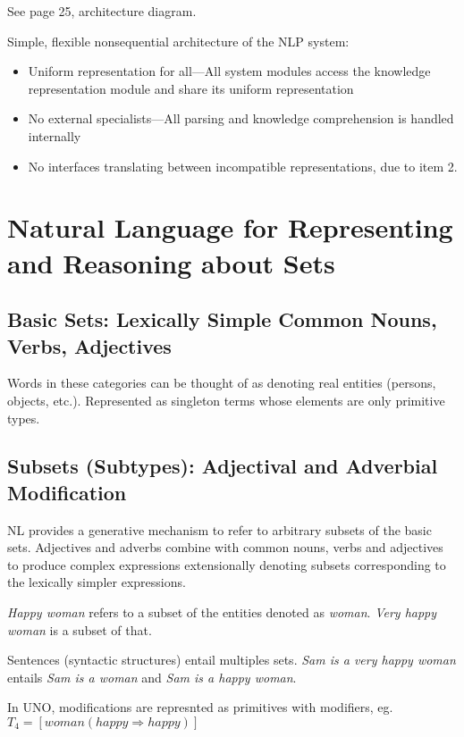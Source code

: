 \documentclass[11pt]{article}
\begin{document}
See page 25, architecture diagram.

Simple, flexible nonsequential architecture of the NLP system:

\begin{itemize}
\item Uniform representation for all---All system modules access the knowledge representation module and share its uniform representation
\item No external specialists---All parsing and knowledge comprehension is handled internally
\item No interfaces translating between incompatible representations, due to item 2.
\end{itemize}

\section{Natural Language for Representing and Reasoning about Sets}

\subsection{Basic Sets: Lexically Simple Common Nouns, Verbs, Adjectives}

Words in these categories can be thought of as denoting real entities (persons, objects, etc.). Represented as singleton terms whose elements are only primitive types.

\subsection{Subsets (Subtypes): Adjectival and Adverbial Modification}

NL provides a generative mechanism to refer to arbitrary subsets of the basic sets.  Adjectives and adverbs combine with common nouns, verbs and adjectives to produce complex expressions extensionally denoting subsets corresponding to the lexically simpler expressions.

\emph{Happy woman} refers to a subset of the entities denoted as \emph{woman}.  \emph{Very happy woman} is a subset of that.

Sentences (syntactic structures) entail multiples sets.  \emph{Sam is a very happy woman} entails \emph{Sam is a woman} and \emph{Sam is a happy woman}.

In UNO, modifications are represnted as primitives with modifiers, eg. $T_4 = [ woman(happy \Rightarrow happy) ]$
\end{document}
